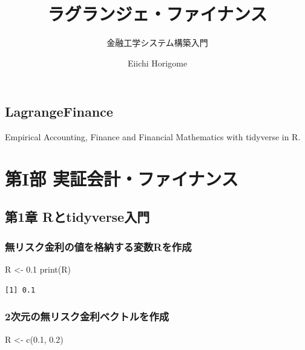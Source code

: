 \documentclass[
  letterpaper,
  DIV=11,
  numbers=noendperiod]{scrreprt}
\title{ラグランジェ・ファイナンス}
\subtitle{金融工学システム構築入門}
\author{Eiichi Horigome}
\date{}
\newenvironment{Shaded}{\begin{snugshade}}{\end{snugshade}}
\newcommand{\FloatTok}[1]{\textcolor[rgb]{0.68,0.00,0.00}{#1}}
\newcommand{\FunctionTok}[1]{\textcolor[rgb]{0.28,0.35,0.67}{#1}}
\newcommand{\NormalTok}[1]{\textcolor[rgb]{0.00,0.23,0.31}{#1}}
\newcommand{\OtherTok}[1]{\textcolor[rgb]{0.00,0.23,0.31}{#1}}
\renewcommand*\contentsname{Table of contents}
\newcommand\contentsname{Table of contents}
\begin{document}
\maketitle

\renewcommand*\contentsname{Table of contents}
{
\setcounter{tocdepth}{2}
\tableofcontents
}


\chapter{LagrangeFinance}\label{lagrangefinance}

Empirical Accounting, Finance and Financial Mathematics with tidyverse
in R.

\part{第I部 実証会計・ファイナンス}

\chapter{第1章
Rとtidyverse入門}\label{ux7b2c1ux7ae0-rux3068tidyverseux5165ux9580}

\section{無リスク金利の値を格納する変数Rを作成}\label{ux7121ux30eaux30b9ux30afux91d1ux5229ux306eux5024ux3092ux683cux7d0dux3059ux308bux5909ux6570rux3092ux4f5cux6210}

\begin{Shaded}
\begin{Highlighting}[]
\NormalTok{R }\OtherTok{\textless{}{-}} \FloatTok{0.1}
\FunctionTok{print}\NormalTok{(R) }
\end{Highlighting}
\end{Shaded}

\begin{verbatim}
[1] 0.1
\end{verbatim}

\section{2次元の無リスク金利ベクトルを作成}\label{ux6b21ux5143ux306eux7121ux30eaux30b9ux30afux91d1ux5229ux30d9ux30afux30c8ux30ebux3092ux4f5cux6210}

\begin{Shaded}
\begin{Highlighting}[]
\NormalTok{R }\OtherTok{\textless{}{-}} \FunctionTok{c}\NormalTok{(}\FloatTok{0.1}\NormalTok{, }\FloatTok{0.2}\NormalTok{)}
\end{Highlighting}
\end{Shaded}
\end{document}

